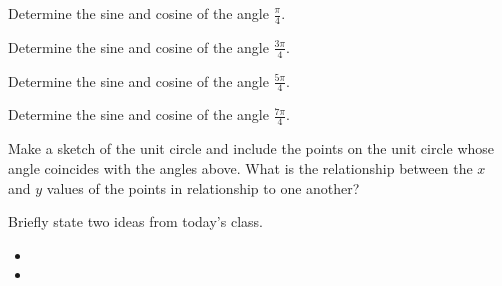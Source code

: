 
\begin{problem}
\item Determine the sine and cosine of the angle $\frac{\pi}{4}$.
  \vfill
\item Determine the sine and cosine of the angle $\frac{3\pi}{4}$.
  \vfill
\item Determine the sine and cosine of the angle $\frac{5\pi}{4}$.
  \vfill
\item Determine the sine and cosine of the angle $\frac{7\pi}{4}$.
  \vfill
\item Make a sketch of the unit circle and include the points on the
  unit circle whose angle coincides with the angles above. What is the
  relationship between the $x$ and $y$ values of the points in relationship
  to one another?
  \vfill
\end{problem}


\begin{problem}
\item
  \begin{subproblem}
    \item
  \end{subproblem}
\end{problem}

\postClass

\begin{problem}
\item Briefly state two ideas from today's class.
  \begin{itemize}
  \item
  \item
  \end{itemize}
\item
  \begin{subproblem}
    \item
  \end{subproblem}
\end{problem}


